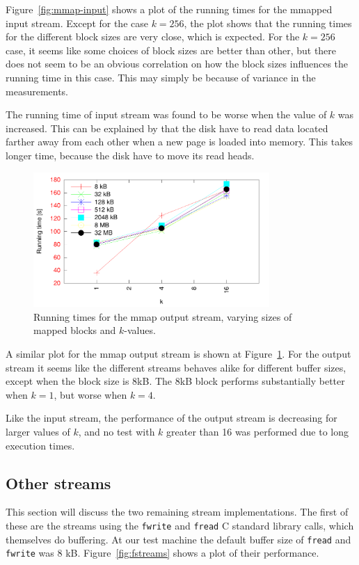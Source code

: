 \documentclass[a4paper,12pt]{article}
\begin{document}
Figure~\ref{fig:mmap-input} shows a plot of the running times for the
mmapped input stream. Except for the case $k = 256$, the plot shows
that the running times for the different block sizes are very close,
which is expected. For the $k = 256$ case, it seems like some choices
of block sizes are better than other, but there does not seem to be an
obvious correlation on how the block sizes influences the running time
in this case. This may simply be because of variance in the
measurements.

The running time of input stream was found to be worse when the value
of $k$ was increased. This can be explained by that the disk have to
read data located farther away from each other when a new page is
loaded into memory. This takes longer time, because the disk have to
move its read heads.

\begin{figure}[h!]
  \centering
  \includegraphics[width=0.8\textwidth]{mmap_output}
  \caption{Running times for the mmap output stream, varying sizes of
    mapped blocks and $k$-values.}
  \label{fig:mmap-output}
\end{figure}

A similar plot for the mmap output stream is shown at
Figure~\ref{fig:mmap-output}. For the output stream it seems like the
different streams behaves alike for different buffer sizes, except
when the block size is 8kB. The 8kB block performs substantially
better when $k = 1$, but worse when $k = 4$.

Like the input stream, the performance of the output stream is
decreasing for larger values of $k$, and no test with $k$ greater than
16 was performed due to long execution times.

\subsection{Other streams}
\label{sec:other-streams}
This section will discuss the two remaining stream
implementations. The first of these are the streams using the
\texttt{fwrite} and \texttt{fread} C standard library calls, which
themselves do buffering. At our test machine the default buffer size
of \texttt{fread} and \texttt{fwrite} was 8
kB. Figure~\ref{fig:fstreams} shows a plot of their performance.
\end{document}
